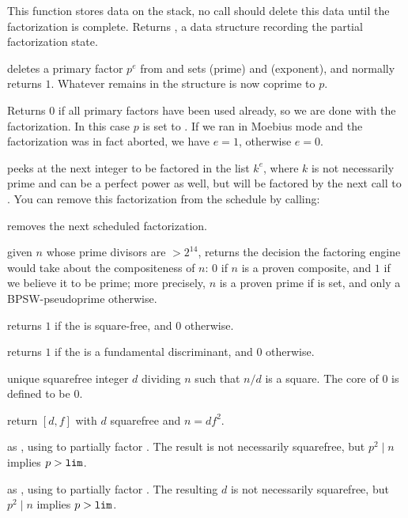 This function stores data on the stack, no  call should
delete this data until the factorization is complete. Returns ,
a data structure recording the partial factorization state.

 deletes a primary factor
$p^e$ from  and sets  (prime) and  (exponent), and
normally returns $1$. Whatever remains in the  structure is now
coprime to $p$.

Returns $0$ if all primary factors have been used already, so we are done
with the factorization. In this case $p$ is set to . If we ran in
Moebius mode and the factorization was in fact aborted, we have $e = 1$,
otherwise $e = 0$.

 peeks at the next integer
to be factored in the list $k^e$, where $k$ is not necessarily prime
and can be a perfect power as well, but will be factored by the next call to
. You can remove this factorization from the schedule by
calling:

 removes the next scheduled factorization.

 given $n$ whose prime divisors are $> 2^{14}$,
returns the decision the factoring engine would take about the compositeness
of $n$: $0$ if $n$ is a proven composite, and $1$ if we believe it to be
prime; more precisely, $n$ is a proven prime if  is
set, and only a BPSW-pseudoprime otherwise.


 returns $1$ if the  
is square-free, and $0$ otherwise.

 returns $1$ if the  
is a fundamental discriminant, and $0$ otherwise.

 unique squarefree integer $d$ dividing $n$ such that
$n/d$ is a square. The core of $0$ is defined to be $0$.

 return $[d,f]$ with $d$ squarefree and $n = df^2$.

 as , using
 to partially factor . The result is not
necessarily squarefree, but $p^2 \mid n$ implies $p > {\tt lim}$.

 as , using
 to partially factor . The resulting $d$ is not
necessarily squarefree, but $p^2 \mid n$ implies $p > {\tt lim}$.



